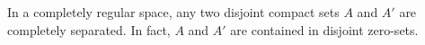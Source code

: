 In a completely regular space, any two disjoint compact sets $A$ and $A'$ are completely separated. In fact, $A$ and $A'$ are contained in disjoint zero-sets.
